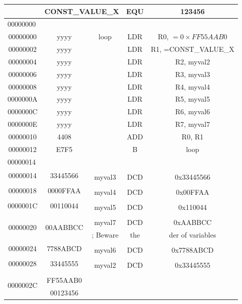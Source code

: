 \documentclass[10pt]{article}
\begin{document}
\begin{center}
\begin{tabular}{|c|c|c|c|c|}
\hline
 & \multicolumn{2}{|l|}{CONST\_VALUE\_X} & EQU & 123456 \\
\hline
\multicolumn{5}{|l|}{00000000} \\
\hline
00000000 & yyyy & loop & LDR & R0, $=0 \times F F 55 A A B 0$ \\
\hline
00000002 & yyyy &  & LDR & R1, =CONST\_VALUE\_X \\
\hline
00000004 & yyyy &  & LDR & R2, myval2 \\
\hline
00000006 & yyyy &  & LDR & R3, myval3 \\
\hline
00000008 & yyyy &  & LDR & R4, myval4 \\
\hline
0000000A & yyyy &  & LDR & R5, myval5 \\
\hline
0000000C & yyyy &  & LDR & R6, myval6 \\
\hline
0000000E & yyyy &  & LDR & R7, myval7 \\
\hline
00000010 & 4408 &  & ADD & R0, R1 \\
\hline
00000012 & E7F5 &  & B & loop \\
\hline
\multicolumn{5}{|l|}{00000014} \\
\hline
\multirow[t]{2}{*}{00000014} & \multirow[t]{2}{*}{33445566} &  &  &  \\
\hline
 &  & myval3 & DCD & 0x33445566 \\
\hline
\multirow[t]{2}{*}{00000018} & \multirow[t]{2}{*}{0000FFAA} &  &  &  \\
\hline
 &  & myval4 & DCD & 0x00FFAA \\
\hline
\multirow[t]{2}{*}{0000001C} & \multirow[t]{2}{*}{00110044} &  &  &  \\
\hline
 &  & myval5 & DCD & 0x110044 \\
\hline
\multirow[t]{3}{*}{00000020} & \multirow[t]{3}{*}{00AABBCC} &  &  &  \\
\hline
 &  & myval7 & DCD & 0xAABBCC \\
\hline
 &  & ; Beware & the & der of variables \\
\hline
\multirow[t]{2}{*}{00000024} & \multirow[t]{2}{*}{7788ABCD} &  &  &  \\
\hline
 &  & myval6 & DCD & 0x7788ABCD \\
\hline
\multirow[t]{2}{*}{00000028} & \multirow[t]{2}{*}{33445555} &  &  &  \\
\hline
 &  & myval2 & DCD & 0x33445555 \\
\hline
\multirow[t]{3}{*}{0000002C} &  &  &  &  \\
\hline
 & FF55AAB0 &  &  &  \\
\hline
 & 00123456 &  &  &  \\
\hline
\end{tabular}
\end{center}
\end{document}
